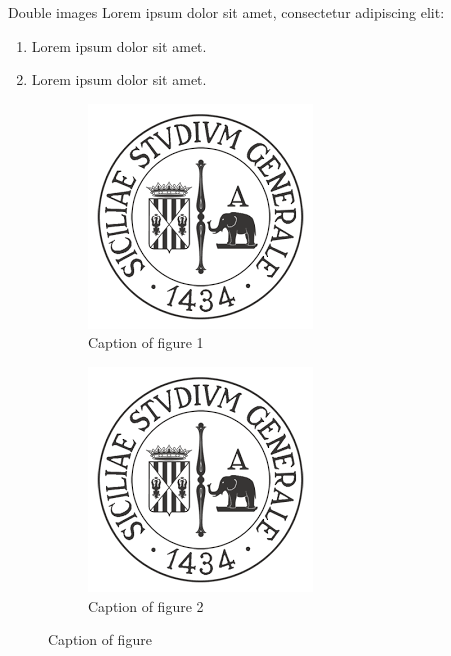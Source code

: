 \begin{frame}{Double images}
     Lorem ipsum dolor sit amet, consectetur adipiscing elit:
    \begin{enumerate}
        \item Lorem ipsum dolor sit amet.
        \item Lorem ipsum dolor sit amet.
    \end{enumerate}
\begin{figure}
    \begin{subfigure}{0.3\textwidth}
        \centering
        \includegraphics[scale=0.3]{img/logo.png}
        \caption{Caption of figure 1}
        \label{fig:sub-figure-url-1}
    \end{subfigure}
    \begin{subfigure}{0.3\textwidth}
        \centering
        \includegraphics[scale=0.3]{img/logo.png}
        \caption{Caption of figure 2}
        \label{fig:sub-figure-url-2}
    \end{subfigure}
    \caption{Caption of figure}
    \label{fig:example-subfigure}
\end{figure}
\end{frame}

